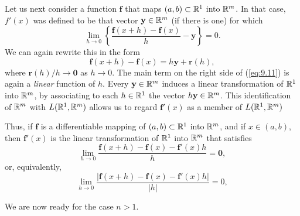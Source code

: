 \begin{myDef}
    Let us next consider a function $\mathbf{f}$ that maps $(a, b) \subset {\protect\mathbb R}^1$ into ${\protect\mathbb R}^m$. In that case, $f'(x)$ was defined to be that vector $\mathbf{y} \in {\protect\mathbb R}^m$ (if there is one) for which
    \begin{equation}
        \label{eq:9.10}
        \lim_{h \to 0} \left\{ \frac{\mathbf{f}(x+h) - \mathbf{f}(x)}{h} - \mathbf{y} \right\} = 0.
    \end{equation}
    We can again rewrite this in the form
    \begin{equation}
        \label{eq:9.11}
        \mathbf{f}(x+h) - \mathbf{f}(x) = h \mathbf{y} + \mathbf{r}(h) ,
    \end{equation}
    where $\mathbf{r}(h)/h \rightarrow \mathbf{0}$ as $h \rightarrow 0$.
    The main term on the right side of (\ref{eq:9.11}) is again a \emph{linear} function of $h$.
    Every $\mathbf{y} \in {\protect\mathbb R}^m$ induces a linear transformation of ${\protect\mathbb R}^1$ into ${\protect\mathbb R}^m$, by associating to each $h \in {\protect\mathbb R}^1$ the vector $h \mathbf{y} \in {\protect\mathbb R}^m$.
    This identification of ${\protect\mathbb R}^m$ with $L({\protect\mathbb R}^1, {\protect\mathbb R}^m)$ allows us to regard $\mathbf{f}'(x)$ as a member of $L({\protect\mathbb R}^1,{\protect\mathbb R}^m)$

    Thus, if $\mathbf{f}$ is a differentiable mapping of $(a,b) \subset {\protect\mathbb R}^1$ into ${\protect\mathbb R}^m$, and if $x \in (a,b)$,
    then $\mathbf{f}'(x)$ is the linear transformation of ${\protect\mathbb R}^1$ into ${\protect\mathbb R}^m$ that satisfies
    \begin{equation}
        \label{eq:9.12}
        \lim_{h \to 0} \frac{\mathbf{f}(x+h) - \mathbf{f}(x) - \mathbf{f}'(x)h}{h} = \mathbf{0},
    \end{equation}
    or, equivalently,
    \begin{equation}
        \label{eq:9.13}
        \lim_{h \to 0} \frac{\left| \mathbf{f}(x+h) - \mathbf{f}(x) - \mathbf{f}'(x)h \right|}{\left| h \right|} = 0,
    \end{equation}

    We are now ready for the case $n > 1$.
\end{myDef}

